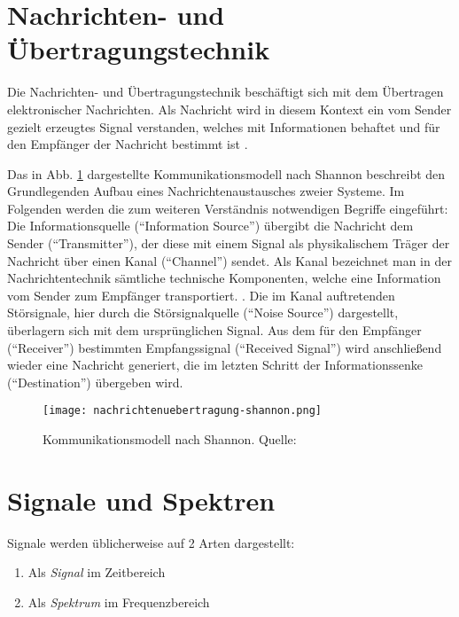 \newpage
\section{Nachrichten- und Übertragungstechnik}
Die Nachrichten- und Übertragungstechnik beschäftigt sich mit dem Übertragen elektronischer Nachrichten. Als Nachricht wird in diesem Kontext ein vom Sender gezielt erzeugtes Signal verstanden, welches mit Informationen behaftet und für den Empfänger der Nachricht bestimmt ist \cite[vgl. Werner, S. 3]{Werner:2006}.

Das in Abb. \ref{nachrichtenuebertragung} dargestellte Kommunikationsmodell nach Shannon beschreibt den Grundlegenden Aufbau eines Nachrichtenaustausches zweier Systeme. 
Im Folgenden werden die zum weiteren Verständnis notwendigen Begriffe eingeführt:\newline
Die Informationsquelle (\enquote{Information Source}) übergibt die Nachricht dem Sender (\enquote{Transmitter}), der diese mit einem Signal als physikalischem Träger der Nachricht über einen Kanal (\enquote{Channel}) sendet. \newline
Als Kanal bezeichnet man in der Nachrichtentechnik sämtliche technische Komponenten, welche eine Information vom Sender zum Empfänger transportiert. \cite[vgl. Dankmeier, S. 13]{Dankmeier:2017}.\newline
Die im Kanal auftretenden Störsignale, hier durch die Störsignalquelle (\enquote{Noise Source}) dargestellt, überlagern sich mit dem ursprünglichen Signal. Aus dem für den Empfänger (\enquote{Receiver}) bestimmten Empfangssignal (\enquote{Received Signal}) wird anschließend wieder eine Nachricht generiert, die im letzten Schritt der Informationssenke (\enquote{Destination}) übergeben wird.

\begin{figure}[ht]
	\centering
	\texttt{[image: nachrichtenuebertragung-shannon.png]}
	\caption[Kommunikationsmodell nach Shannon]{Kommunikationsmodell nach Shannon. Quelle: \cite[Werner, S. 11f]{Werner:2017}} 
	\label{nachrichtenuebertragung}
\end{figure}

\section{Signale und Spektren}
Signale werden üblicherweise auf 2 Arten dargestellt:
\begin{enumerate}
	\item Als \textit{Signal} im Zeitbereich
	\item Als \textit{Spektrum} im Frequenzbereich
\end{enumerate}


